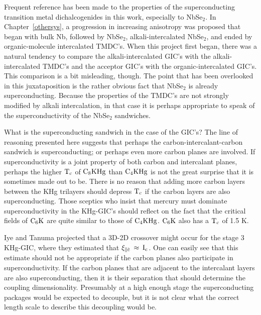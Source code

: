         Frequent   reference  has   been  made  to  the   properties of the
superconducting transition metal  dichalcogenides in this  work, especially
to  NbSe$_2$.  In  Chapter~\ref{othersys},   a   progression  in increasing
anisotropy was  proposed that  began with   bulk Nb, followed  by NbSe$_2$,
alkali-intercalated NbSe$_2$,  and ended  by  organic-molecule intercalated
TMDC's.   When this  project first began,  there was a natural  tendency to
compare the alkali-intercalated  GIC's with  the alkali-intercalated TMDC's
and  the  acceptor  GIC's   with   the  organic-intercalated GIC's.    This
comparison is a bit misleading, though.  The point that has been overlooked
in this juxataposition is the rather obvious fact that NbSe$_2$  is already
superconducting.  Because  the properties of the  TMDC's  are  not strongly
modified  by   alkali intercalation,\cite{woollam76} in  that   case  it is
perhaps appropriate   to speak of   the   superconductivity of the NbSe$_2$
sandwiches.

        What is the superconducting sandwich in the case of the GIC's?  The
line  of reasoning     presented   here   suggests   that    perhaps    the
carbon-intercalant-carbon sandwich is superconducting; or perhaps even more
carbon  planes are involved.   If superconductivity is  a joint property of
both carbon and intercalant planes,  perhaps the higher  $\rm T_c$ of  $\rm
C_8KHg$ than $\rm  C_4KHg$ is not the great  surprise that it  is sometimes
made out to be.  There is no reason that adding more  carbon layers between
the KHg trilayers  should depress $\rm  T_c$ if the  carbon layers are also
superconducting.  Those sceptics  who insist   that  mercury must  dominate
superconductivity in  the KHg-GIC's should  reflect on  the  fact that  the
critical fields of $\rm C_6K$\cite{avdeev87}  are quite similar to those of
$\rm C_4KHg$.  $\rm C_6K$ also has a $\rm T_c$ of 1.5 K.\cite{avdeev87}

        Iye and Tanuma projected that a 3D-2D crossover might occur for the
stage 3 KHg-GIC, where they estimated that $\rm \xi_{\parallel \hat{c}} \:
\approx \: I_c$.\cite{iye82}  One can easily see that this estimate should
not   be    appropriate   if  the  carbon  planes    also  participate   in
superconductivity.   If the   carbon   planes that  are    adjacent  to the
intercalant  layers  are also superconducting, then  it is their separation
that  should determine the  coupling  dimensionality.  Presumably at a high
enough stage the superconducting  packages  would be expected to  decouple,
but it  is   not clear what  the  correct  length  scale to  describe  this
decoupling would be.

